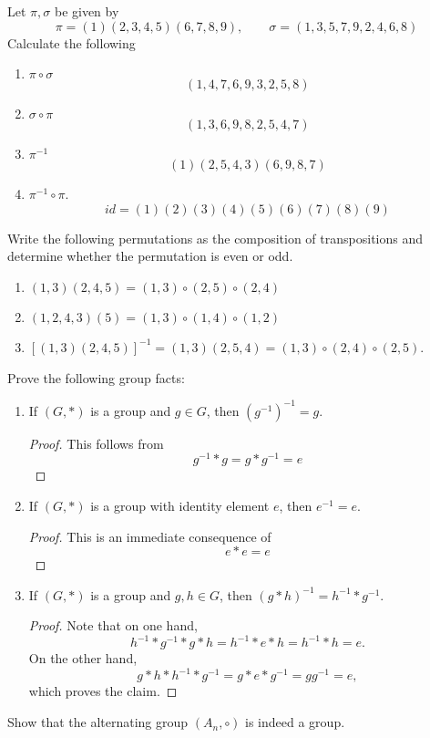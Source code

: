 \documentclass[11pt]{preprint}
\def\enumb{\begin{enumerate}}
\def\enume{\end{enumerate}}
\begin{document}
\item Let $\pi,\sigma$ be given by
\[
\pi=(1)(2,3,4,5)(6,7,8,9),\qquad\sigma=(1,3,5,7,9,2,4,6,8)
\]
Calculate the following
\enumb
\item $\pi\circ\sigma$
\[
(1,4,7,6,9,3,2,5,8)
\]
\item $\sigma\circ\pi$
\[
(1,3,6,9,8,2,5,4,7)
\]
\item $\pi^{-1}$
\[
(1)(2,5,4,3)(6,9,8,7)
\]
\item $\pi^{-1}\circ\pi$.
\[
id=(1)(2)(3)(4)(5)(6)(7)(8)(9)
\]
\enume

\item Write the following permutations as the composition of transpositions and determine whether the permutation is even or odd.
\enumb
\item $(1,3)(2,4,5)=(1,3)\circ(2,5)\circ (2,4)$

\item $(1,2,4,3)(5)=(1,3)\circ (1,4)\circ (1,2)$
\item $[(1,3)(2,4,5)]^{-1}=(1,3)(2,5,4)=(1,3)\circ (2,4)\circ (2,5)$.
\enume

\item Prove the following group facts: 
\enumb
\item If $(G,*)$ is a group and $g\in G$, then $(g^{-1})^{-1}=g$.

\begin{proof}
This follows from
\[
g^{-1}*g=g*g^{-1}=e
\]
\end{proof}
\item  If $(G,*)$ is a group with identity element $e$, then $e^{-1}=e$.

\begin{proof}
This is an immediate consequence of
\[
e*e=e
\]
\end{proof}

\item If $(G,*)$ is a group and $g,h\in G$, then $(g*h)^{-1}=h^{-1}*g^{-1}$.

\begin{proof}
Note that on one hand,
\[
h^{-1}*g^{-1}*g*h=h^{-1}*e*h=h^{-1}*h=e.
\]
On the other hand,
\[
g*h*h^{-1}*g^{-1}=g*e*g^{-1}=gg^{-1}=e,
\]
which proves the claim.
\end{proof}

\enume

\item Show that the alternating group $(A_n,\circ)$ is indeed a group.
\end{document}
